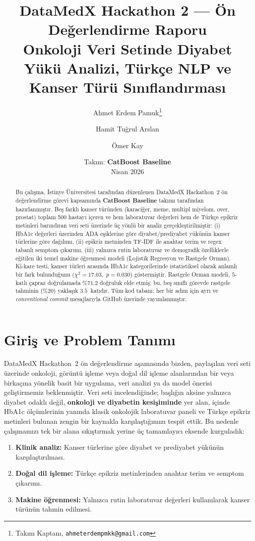 \documentclass[11pt,a4paper]{article}
\title{\textbf{DataMedX Hackathon 2 --- Ön Değerlendirme Raporu}\\[2pt]
       \large Onkoloji Veri Setinde Diyabet Yükü Analizi, Türkçe NLP ve Kanser Türü Sınıflandırması}
\author[1]{Ahmet Erdem Pamuk\thanks{Takım Kaptanı, \texttt{ahmeterdempmkk@gmail.com}}}
\author[2]{Hamit Tuğrul Arslan}
\author[3]{Ömer Kay}
\affil[1]{Mustafa Hakan Güvençer Fen Lisesi, Ankara}
\affil[2]{İstanbul Teknik Üniversitesi Mesleki ve Teknik Anadolu Lisesi, İstanbul}
\affil[3]{Özel Çağdaş Eğitim Anadolu Lisesi, İzmir}
\date{Takım: \textbf{CatBoost Baseline} \\[2pt] Nisan 2026}
\begin{document}
\maketitle

\begin{abstract}
\noindent
Bu çalışma, İstinye Üniversitesi tarafından düzenlenen DataMedX Hackathon~2 ön değerlendirme görevi kapsamında \textbf{CatBoost Baseline} takımı tarafından hazırlanmıştır. Beş farklı kanser türünden (karaciğer, meme, multipl miyelom, over, prostat) toplam 500 hastayı içeren ve hem laboratuvar değerleri hem de Türkçe epikriz metinleri barındıran veri seti üzerinde üç yönlü bir analiz gerçekleştirilmiştir: (i) HbA1c değerleri üzerinden ADA eşiklerine göre diyabet/prediyabet yükünün kanser türlerine göre dağılımı, (ii) epikriz metninden TF-IDF ile anahtar terim ve regex tabanlı semptom çıkarımı, (iii) yalnızca rutin laboratuvar ve demografik özelliklerle eğitilen iki temel makine öğrenmesi modeli (Lojistik Regresyon ve Rastgele Orman). Ki-kare testi, kanser türleri arasında HbA1c kategorilerinde istatistiksel olarak anlamlı bir fark bulunduğunu ($\chi^2{=}17.03$,~$p{=}0.030$) göstermiştir. Rastgele Orman modeli, $5$-katlı çapraz doğrulamada $\%71.2$ doğruluk elde etmiş; bu, beş sınıflı görevde rastgele tahminin (\%20) yaklaşık $3.5$~katıdır. Tüm kod tabanı; her bir adım için ayrı ve \emph{conventional commit} mesajlarıyla GitHub üzerinde yayımlanmıştır.
\end{abstract}

\section{Giriş ve Problem Tanımı}

DataMedX Hackathon~2 ön değerlendirme aşamasında bizden, paylaşılan veri seti üzerinde onkoloji, görüntü işleme veya doğal dil işleme alanlarından bir veya birkaçına yönelik basit bir uygulama, veri analizi ya da model önerisi geliştirmemiz beklenmiştir. Veri seti incelendiğinde; başlığın aksine yalnızca diyabet odaklı değil, \textbf{onkoloji ve diyabetin kesişiminde} yer alan, içinde HbA1c ölçümlerinin yanında klasik onkolojik laboratuvar paneli ve Türkçe epikriz metinleri bulunan zengin bir kaynakla karşılaştığımızı tespit ettik. Bu nedenle çalışmamızı tek bir alana sıkıştırmak yerine üç tamamlayıcı eksende kurguladık:

\begin{enumerate}[leftmargin=1.5em,itemsep=2pt]
    \item \textbf{Klinik analiz:} Kanser türlerine göre diyabet ve prediyabet yükünün karşılaştırılması.
    \item \textbf{Doğal dil işleme:} Türkçe epikriz metinlerinden anahtar terim ve semptom çıkarımı.
    \item \textbf{Makine öğrenmesi:} Yalnızca rutin laboratuvar değerleri kullanılarak kanser türünün tahmin edilmesi.
\end{enumerate}
\end{document}

